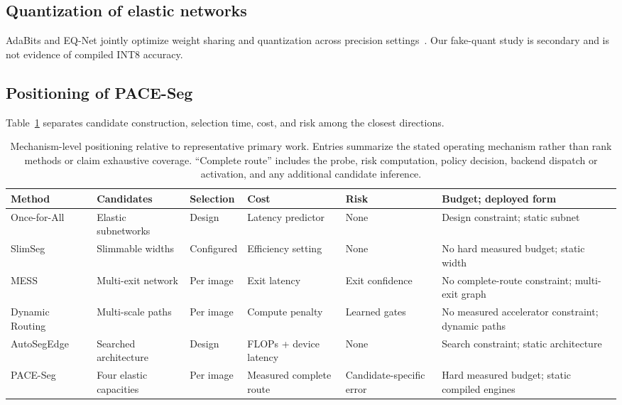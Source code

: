 \documentclass[a4paper,review,12pt]{elsarticle}
\newcommand{\method}{PACE-Seg}
\begin{document}
\subsection{Quantization of elastic networks}

AdaBits and EQ-Net jointly optimize weight sharing and quantization across precision settings~\cite{jin2020adabits,xu2023eqnet}. Our fake-quant study is secondary and is not evidence of compiled INT8 accuracy.

\subsection{Positioning of PACE-Seg}

Table~\ref{tab:related-positioning} separates candidate construction, selection time, cost, and risk among the closest directions.

\begin{table}[H]
\centering
\caption{Mechanism-level positioning relative to representative primary work. Entries summarize the stated operating mechanism rather than rank methods or claim exhaustive coverage. ``Complete route'' includes the probe, risk computation, policy decision, backend dispatch or activation, and any additional candidate inference.}
\label{tab:related-positioning}
\scriptsize
\setlength{\tabcolsep}{2pt}
\renewcommand{\arraystretch}{1.08}
\begin{tabular}{@{}>{\raggedright\arraybackslash}p{2.3cm}>{\raggedright\arraybackslash}p{2.0cm}>{\raggedright\arraybackslash}p{1.45cm}>{\raggedright\arraybackslash}p{2.1cm}>{\raggedright\arraybackslash}p{2.0cm}>{\raggedright\arraybackslash}p{3.35cm}@{}}
\toprule
Method & Candidates & Selection & Cost & Risk & Budget; deployed form \\
\midrule
Once-for-All~\cite{cai2020ofa} & Elastic subnetworks & Design & Latency predictor & None & Design constraint; static subnet \\
SlimSeg~\cite{xue2022slimseg} & Slimmable widths & Configured & Efficiency setting & None & No hard measured budget; static width \\
MESS~\cite{kouris2022mess} & Multi-exit network & Per image & Exit latency & Exit confidence & No complete-route constraint; multi-exit graph \\
Dynamic Routing~\cite{li2020dynamic} & Multi-scale paths & Per image & Compute penalty & Learned gates & No measured accelerator constraint; dynamic paths \\
AutoSegEdge~\cite{dou2023autosegedge} & Searched architecture & Design & FLOPs + device latency & None & Search constraint; static architecture \\
\method{} & Four elastic capacities & Per image & Measured complete route & Candidate-specific error & Hard measured budget; static compiled engines \\
\bottomrule
\end{tabular}
\end{table}
\end{document}
